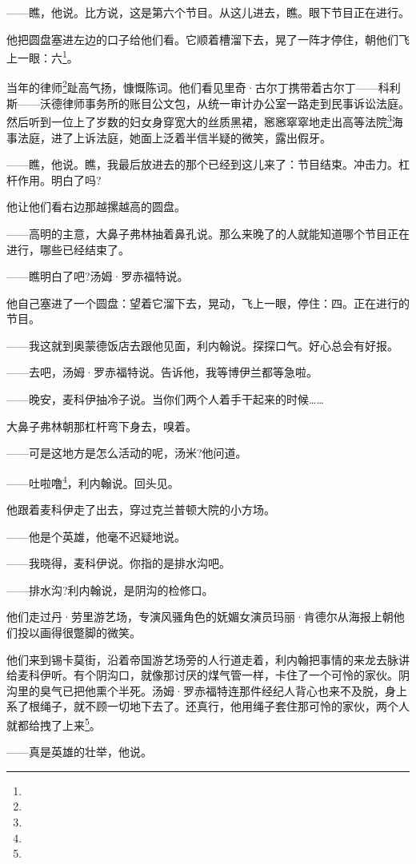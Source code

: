 \par ——瞧，他说。比方说，这是第六个节目。从这儿进去，瞧。眼下节目正在进行。
\par 他把圆盘塞进左边的口子给他们看。它顺着槽溜下去，晃了一阵才停住，朝他们飞上一眼：六\footnote{}。
\par 当年的律师\footnote{}趾高气扬，慷慨陈词。他们看见里奇·古尔丁携带着古尔丁——科利斯——沃德律师事务所的账目公文包，从统一审计办公室一路走到民事诉讼法庭。然后听到一位上了岁数的妇女身穿宽大的丝质黑裙，窸窸窣窣地走出高等法院\footnote{}海事法庭，进了上诉法庭，她面上泛着半信半疑的微笑，露出假牙。
\par ——瞧，他说。瞧，我最后放进去的那个已经到这儿来了：节目结束。冲击力。杠杆作用。明白了吗?
\par 他让他们看右边那越摞越高的圆盘。
\par ——高明的主意，大鼻子弗林抽着鼻孔说。那么来晚了的人就能知道哪个节目正在进行，哪些已经结束了。
\par ——瞧明白了吧?汤姆·罗赤福特说。
\par 他自己塞进了一个圆盘：望着它溜下去，晃动，飞上一眼，停住：四。正在进行的节目。
\par ——我这就到奥蒙德饭店去跟他见面，利内翰说。探探口气。好心总会有好报。
\par ——去吧，汤姆·罗赤福特说。告诉他，我等博伊兰都等急啦。
\par ——晚安，麦科伊抽冷子说。当你们两个人着手干起来的时候……
\par 大鼻子弗林朝那杠杆弯下身去，嗅着。
\par ——可是这地方是怎么活动的呢，汤米?他问道。
\par ——吐啦噜\footnote{}，利内翰说。回头见。
\par 他跟着麦科伊走了出去，穿过克兰普顿大院的小方场。
\par ——他是个英雄，他毫不迟疑地说。
\par ——我晓得，麦科伊说。你指的是排水沟吧。
\par ——排水沟?利内翰说，是阴沟的检修口。
\par 他们走过丹·劳里游艺场，专演风骚角色的妩媚女演员玛丽·肯德尔从海报上朝他们投以画得很蹩脚的微笑。
\par 他们来到锡卡莫街，沿着帝国游艺场旁的人行道走着，利内翰把事情的来龙去脉讲给麦科伊听。有个阴沟口，就像那讨厌的煤气管一样，卡住了一个可怜的家伙。阴沟里的臭气已把他熏个半死。汤姆·罗赤福特连那件经纪人背心也来不及脱，身上系了根绳子，就不顾一切地下去了。还真行，他用绳子套住那可怜的家伙，两个人就都给拽了上来\footnote{}。
\par ——真是英雄的壮举，他说。
